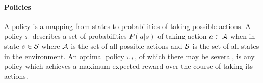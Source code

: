 
\paragraph*{Policies}

A policy is a mapping from states to probabilities of taking possible actions.
%
A policy $\pi$ describes a set of probabilities $P(a|s)$
of taking action $a \in \mathcal{A}$
when in state $s \in \mathcal{S}$
where $\mathcal{A}$ is the set of all possible actions
and $\mathcal{S}$ is the set of all states in the environment.
%
An optimal policy $\pi_*$,
of which there may be several,
is any policy which achieves a maximum expected reward over the course of
taking its actions.

